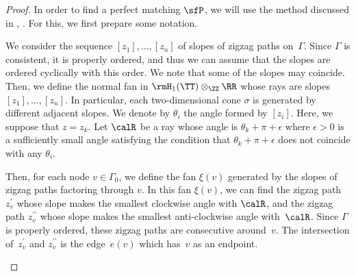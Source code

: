 \begin{proof}
In order to find a perfect matching $\sfP$, we will use the method discussed in \cite[Section~3]{Gul}, \cite[Section~4]{Bro}.
For this, we first prepare some notation.

We consider the sequence $[z_1],\dots,[z_n]$ of slopes of zigzag paths on~$\Gamma$.
Since $\Gamma$ is consistent, it is properly ordered, and thus we can assume that the slopes are ordered cyclically with this order.
We note that some of the slopes may coincide.
Then, we define the normal fan in $\rmH_1(\TT)\otimes_\ZZ\RR$ whose rays are slopes $[z_1],\dots,[z_n]$.
In particular, each two-dimensional cone $\sigma$ is generated by different adjacent slopes.
We denote by $\theta_i$ the angle formed by $[z_i]$. Here, we suppose that $z=z_k$.
Let $\calR$ be a ray whose angle is $\theta_k+\pi+\epsilon$ where $\epsilon>0$ is a sufficiently small angle satisfying the condition that $\theta_k+\pi+\epsilon$ does not coincide with any $\theta_i$.

Then, for each node $v\in\Gamma_0$, we define the fan $\xi(v)$ generated by the slopes of zigzag paths factoring through $v$.
In this fan $\xi(v)$, we can find the zigzag path $z^\prime_v$ whose slope makes the smallest clockwise angle with $\calR$, and the zigzag path $z^{\prime\prime}_v$ whose slope makes the smallest anti-clockwise angle with~$\calR$.
Since $\Gamma$ is properly ordered, these zigzag paths are consecutive around~$v$.
The intersection of~$z^\prime_v$ and $z^{\prime\prime}_v$ is the edge~$e(v)$ which has~$v$ as an endpoint.

\begin{center}
{}
\end{center}
\end{proof}
